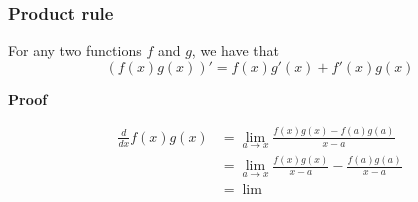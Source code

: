 \subsubsection{Product rule}
For any two functions \(f\) and \(g\), we have that
\begin{equation}
    \left(f(x)g(x)\right)' = f(x)g'(x) + f'(x)g(x)
\end{equation}

\textbf{Proof}

\begin{align*}
    \frac{d}{dx}f(x)g(x) &= \lim_{a\to x} \frac{f(x)g(x) - f(a)g(a)}{x - a} \\
    &= \lim_{a \to x} \frac{f(x)g(x)}{x - a} - \frac{f(a)g(a)}{x - a} \\
    &= \lim
\end{align*}